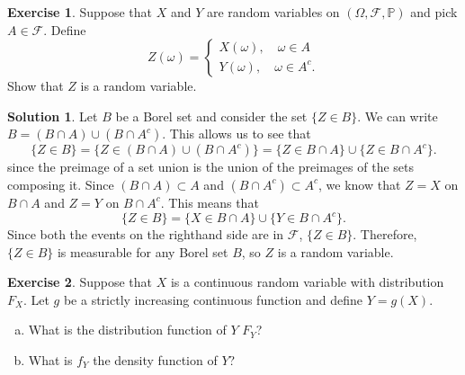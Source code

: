 \documentclass[12pt]{article}
\newcommand{\Prob}{\mathbb{P}}
\newcommand{\calF}{\mathcal{F}}
\theoremstyle{definition}
\newtheorem{exer}{Exercise}
\newtheorem{sol}{Solution}
\theoremstyle{remark}
\begin{document}
\begin{exer}
    Suppose that $X$ and $Y$ are random variables on $(\Omega, \calF, \Prob)$ and pick $A\in \calF$. Define
    \begin{equation}
        Z(\omega) = \begin{cases}
            X(\omega), \quad \omega\in A \\
            Y(\omega), \quad \omega\in A^c.
        \end{cases}
    \end{equation}
    Show that $Z$ is a random variable.
\end{exer}
\begin{sol}
Let $B$ be a Borel set and consider the set $\{ Z \in B\}$. We can write $B = (B\cap A) \cup (B \cap A^c)$. This allows us to see that 
\begin{equation}
    \{ Z \in B\} = \{ Z\in  (B\cap A) \cup (B \cap A^c) \}= \{Z\in B\cap A \} \cup \{Z \in B\cap A^c \}.
\end{equation}
since the preimage of a set union is the union of the preimages of the sets composing it. Since $ (B\cap A)\subset A$ and $(B\cap A^c) \subset A^c$, we know that $Z = X$ on $B\cap A$ and $Z=Y$ on $B\cap A^c$. This means that
\begin{equation}
    \{ Z\in B\} = \{X\in B\cap A \} \cup \{Y \in B\cap A^c\}.
\end{equation}
Since both the events on the righthand side are in $\calF$, $\{Z\in B\}$. Therefore, $\{ Z\in B\}$ is measurable for any Borel set $B$, so $Z$ is a random variable.
\end{sol}

\newpage 
\begin{exer}
    Suppose that $X$ is a continuous random variable with distribution $F_X$. Let $g$ be a strictly increasing continuous function and define $Y=g(X)$. 

    \begin{enumerate}[a)]
        \item What is the distribution function of $Y$ $F_Y$?
        \item What is $f_Y$ the density function of $Y$?
    \end{enumerate}
\end{exer}
\end{document}
